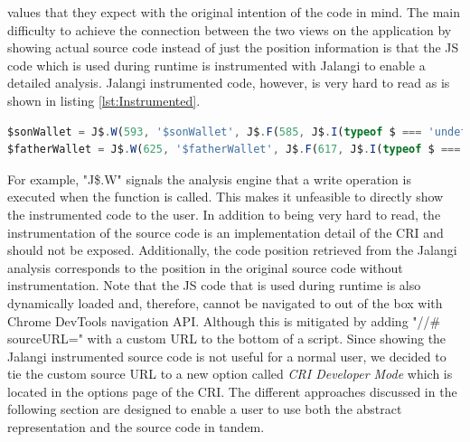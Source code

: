 values that they expect with the original intention of the code in mind. The main difficulty to achieve the connection between the two views on the application by showing actual source code instead of just the position information is that the JS code which is used during runtime is instrumented with Jalangi to enable a detailed analysis. Jalangi instrumented code, however, is very hard to read as is shown in listing \ref{lst:Instrumented}.

\begin{lstlisting}[language=JavaScript, caption={Example of RxJS code.},label={lst:Instrumented}]
$sonWallet = J$.W(593, '$sonWallet', J$.F(585, J$.I(typeof $ === 'undefined' ? $ = J$.R(569, '$', undefined, true, true) : $ = J$.R(569, '$', $, true, true)), false)(J$.T(577, '#wallet-son', 21, false)), J$.I(typeof $sonWallet === 'undefined' ? undefined : $sonWallet), true, true);
$fatherWallet = J$.W(625, '$fatherWallet', J$.F(617, J$.I(typeof $ === 'undefined' ? $ = J$.R(601, '$', undefined, true, true) : $ = J$.R(601, '$', $, true, true)), false)(J$.T(609, '#wallet-father', 21, false)), J$.I(typeof $fatherWallet === 'undefined' ? undefined : $fatherWallet), true, true);
\end{lstlisting}

For example, "J\$.W" signals the analysis engine that a write operation is executed when the function is called. This makes it unfeasible to directly show the instrumented code to the user. In addition to being very hard to read, the instrumentation of the source code is an implementation detail of the CRI and should not be exposed. Additionally, the code position retrieved from the Jalangi analysis corresponds to the position in the original source code without instrumentation. Note that the JS code that is used during runtime is also dynamically loaded and, therefore, cannot be navigated to out of the box with Chrome DevTools navigation API. Although this is mitigated by adding "//\# sourceURL=" with a custom URL to the bottom of a script. Since showing the Jalangi instrumented source code is not useful for a normal user, we decided to tie the custom source URL to a new option called \emph{CRI Developer Mode} which is located in the options page of the CRI. The different approaches discussed in the following section are designed to enable a user to use both the abstract representation and the source code in tandem.
